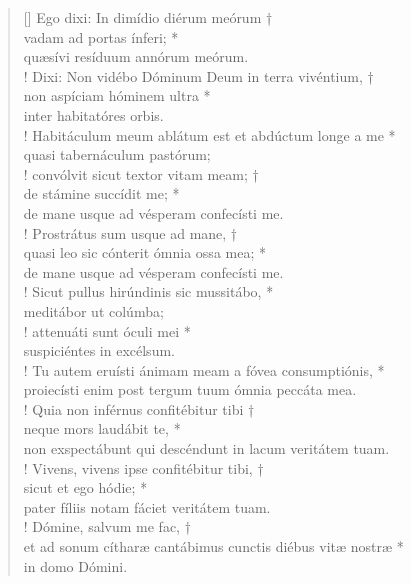 \begin{verse}[\versewidth]
Ego dixi: In dimídio diérum meórum †\\
vadam ad portas ínferi; *\\
quæsívi resíduum annórum meórum.\\!
\vin Dixi: Non vidébo Dóminum Deum in terra vivéntium, †\\
\vin non aspíciam hóminem ultra *\\
\vin inter habitatóres orbis.\\!
Habitáculum meum ablátum est et abdúctum longe a me *\\
quasi tabernáculum pastórum;\\!
\vin convólvit sicut textor vitam meam; †\\
\vin de stámine succídit me; *\\
\vin de mane usque ad vésperam confecísti me.\\!
Prostrátus sum usque ad mane, †\\
quasi leo sic cónterit ómnia ossa mea; *\\
de mane usque ad vésperam confecísti me.\\!
\vin Sicut pullus hirúndinis sic mussitábo, *\\
\vin meditábor ut colúmba;\\!
attenuáti sunt óculi mei *\\
suspiciéntes in excélsum.\\!
\vin Tu autem eruísti ánimam meam a fóvea consumptiónis, *\\
\vin proiecísti enim post tergum tuum ómnia peccáta mea.\\!
Quia non inférnus confitébitur tibi †\\
neque mors laudábit te, *\\
non exspectábunt qui descéndunt in lacum veritátem tuam.\\!
\vin Vivens, vivens ipse confitébitur tibi, †\\
\vin sicut et ego hódie; *\\
\vin pater fíliis notam fáciet veritátem tuam.\\!
Dómine, salvum me fac, †\\
et ad sonum cítharæ cantábimus cunctis diébus vitæ nostræ *\\
in domo Dómini.\\
\end{verse}
\vspace{1cm}


